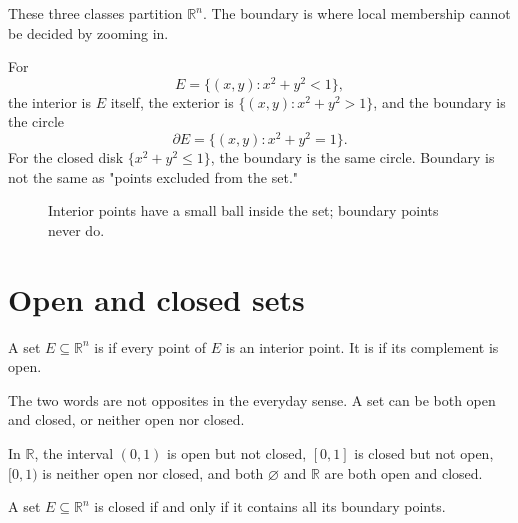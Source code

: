 These three classes partition \(\mathbb R^n\).  The boundary is where local membership cannot be decided by zooming in.

\begin{example}
For
\[
  E=\{(x,y):x^2+y^2<1\},
\]
the interior is \(E\) itself, the exterior is \(\{(x,y):x^2+y^2>1\}\), and the boundary is the circle
\[
  \partial E=\{(x,y):x^2+y^2=1\}.
\]
For the closed disk \(\{x^2+y^2\le1\}\), the boundary is the same circle.  Boundary is not the same as "points excluded from the set."
\end{example}

\begin{figure}[H]
\centering
{}
\caption{Interior points have a small ball inside the set; boundary points never do.}
\end{figure}

\section{Open and closed sets}

\begin{definition}
A set \(E\subseteq\mathbb R^n\) is  if every point of \(E\) is an interior point.  It is  if its complement is open.
\end{definition}

The two words are not opposites in the everyday sense.  A set can be both open and closed, or neither open nor closed.

\begin{example}
In \(\mathbb R\), the interval \((0,1)\) is open but not closed, \([0,1]\) is closed but not open, \([0,1)\) is neither open nor closed, and both \(\varnothing\) and \(\mathbb R\) are both open and closed.
\end{example}

\begin{proposition}
A set \(E\subseteq\mathbb R^n\) is closed if and only if it contains all its boundary points.
\end{proposition}

